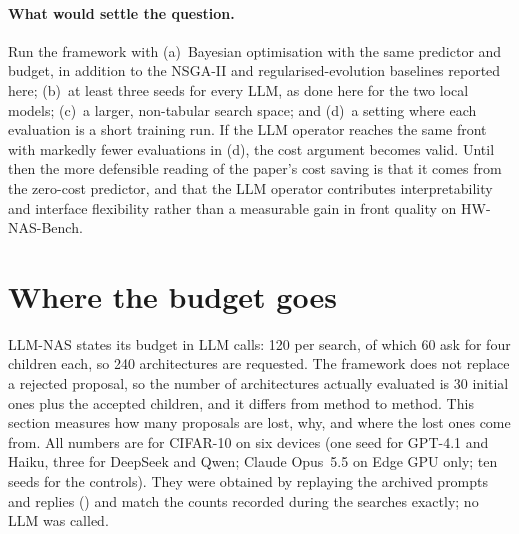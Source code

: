 \paragraph{What would settle the question.} Run the framework with (a)~Bayesian optimisation with the same predictor and budget, in addition to the NSGA-II and regularised-evolution baselines reported here; (b)~at least three seeds for every LLM, as done here for the two local models; (c)~a larger, non-tabular search space; and (d)~a setting where each evaluation is a short training run. If the LLM operator reaches the same front with markedly fewer evaluations in (d), the cost argument becomes valid. Until then the more defensible reading of the paper's cost saving is that it comes from the zero-cost predictor, and that the LLM operator contributes interpretability and interface flexibility rather than a measurable gain in front quality on HW-NAS-Bench.

\section{Where the budget goes}\label{sec:budget}
\noindent LLM-NAS states its budget in LLM calls: 120 per search, of which 60 ask for four children each, so 240 architectures are requested. The framework does not replace a rejected proposal, so the number of architectures actually evaluated is 30 initial ones plus the accepted children, and it differs from method to method. This section measures how many proposals are lost, why, and where the lost ones come from. All numbers are for CIFAR-10 on six devices (one seed for GPT-4.1 and Haiku, three for DeepSeek and Qwen; Claude Opus~5.5 on Edge GPU only; ten seeds for the controls). They were obtained by replaying the archived prompts and replies () and match the counts recorded during the searches exactly; no LLM was called.

